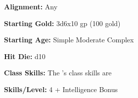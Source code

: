 


\textbf{Alignment:} Any

\textbf{Starting Gold:} 3d6x10 gp (100 gold)

\textbf{Starting Age:} Simple   Moderate   Complex

\textbf{Hit Die:} d10

\textbf{Class Skills:} The \currentclassname{}'s class skills  are

\textbf{Skills/Level:} 4 + Intelligence Bonus

\goodbab{}
\goodfor{}
\goodref{}
\goodwil{}

\begin{classtable}
\levelone{}
\leveltwo{}
\levelthree{}
\levelfour{}
\levelfive{}
\levelsix{}
\levelseven{}
\leveleight{}
\levelnine{}
\levelten{}
\leveleleven{}
\leveltwelve{}
\levelthirteen{}
\levelfourteen{}
\levelfifteen{}
\levelsixteen{}
\levelseventeen{}
\leveleighteen{}
\levelnineteen{}
\leveltwenty{}
\end{classtable}

\classfeatures

